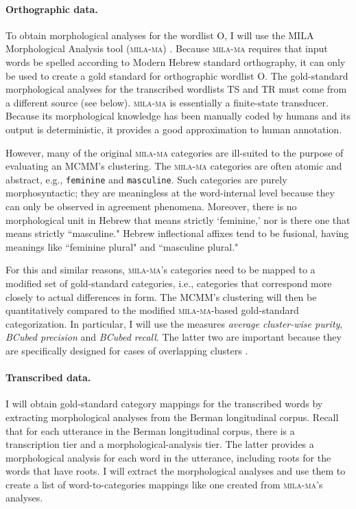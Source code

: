 \paragraph{Orthographic data.}

To obtain morphological analyses for the wordlist O, I will use the MILA Morphological
Analysis tool (\textsc{mila-ma}) \citep{hebrew-resources:2008}.
Because \textsc{mila-ma} requires that input words be spelled 
according to Modern Hebrew standard orthography, it can only be
used to create a gold standard for orthographic wordlist O. The gold-standard morphological analyses
for the transcribed wordlists TS and TR must come from a different source (see below).
\textsc{mila-ma} is essentially a finite-state transducer. Because its morphological knowledge has been manually coded by humans and its output is
deterministic, it provides a good approximation to human
annotation. 

However, many of the original \textsc{mila-ma} categories are
ill-suited to the purpose of evaluating an MCMM's clustering. The \textsc{mila-ma} categories are
often atomic and abstract, e.g., \texttt{feminine} and \texttt{masculine}. Such categories are purely morphosyntactic; they are meaningless at the word-internal level because they can only be observed in agreement phenomena. Moreover, there is no morphological unit in Hebrew that means strictly `feminine,' %
nor is there one that means strictly ``masculine." Hebrew inflectional affixes 
tend to be fusional, having meanings like ``feminine plural" and ``masculine plural."

For this and similar reasons, \textsc{mila-ma}'s categories need to be mapped to a modified set 
of gold-standard categories, i.e., categories that correspond more closely to actual differences in form.
The MCMM's clustering will then be quantitatively compared to the modified \textsc{mila-ma}-based gold-standard categorization. 
In particular, I will use the measures \emph{average cluster-wise purity}, \emph{BCubed precision} and \emph{BCubed recall}. The latter two are important because they are specifically designed for cases of overlapping clusters \citep{amigo-et-al:2009}.

\paragraph{Transcribed data.} I will obtain gold-standard category mappings for the transcribed words by
extracting morphological analyses from the Berman longitudinal corpus.
Recall that for each utterance in the Berman longitudinal corpus, 
there is a transcription tier and a morphological-analysis tier. 
The latter provides a morphological 
analysis for each word in the utterance,
including roots for the words that have roots. I will extract the 
morphological analyses and use them to create a list of word-to-categories mappings like one created
from \textsc{mila-ma}'s analyses.


